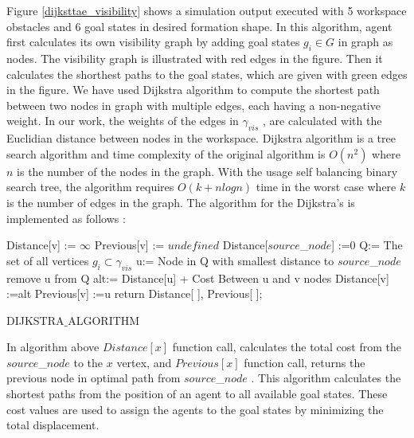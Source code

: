 Figure \ref{dijksttae_visibility} shows a simulation output executed with 5 workspace obstacles and 6 goal states in desired formation shape. In this algorithm, agent first calculates its own visibility graph by adding goal states $g_i \in G$ in graph as nodes. The visibility graph is illustrated with red edges in the figure. Then it calculates the shorthest paths to the goal states, which are given with green edges in the figure. We have used Dijkstra algorithm to compute the shortest path between two nodes in graph with multiple edges, each having a non-negative weight. In our work, the weights of the edges in $\gamma_{vis}$ , are calculated with the Euclidian distance between nodes in the workspace. Dijkstra algorithm is a tree search algorithm and time complexity of the original algorithm is $O(n^2)$ where $n$ is the number of the nodes in the graph. With the usage self balancing binary search tree, the algorithm requires $O(k+nlogn)$ time in the worst case where $k$ is the number of edges in the graph. The algorithm for the Dijkstra's is implemented as follows \cite{92}:
\newpage
	
\begin{algorithm}[H]
{		
Distance[v] := $\infty$ \;
Previous[v] := $undefined$ \;
}
Distance[$source$\_$ node$] :=0  \;
Q:= The set of all vertices $g_i \subset \gamma_{vis}$ \;
{
u:= Node in Q with smallest distance to $source$\_$ node$\;
remove u from Q\;
{
alt:= Distance[u] + Cost Between u and v nodes\;
{
Distance[v] :=alt\;
Previous[v] :=u\;
}
}
}
return Distance[ ], Previous[ ]; \newline
\caption{DIJKSTRA$\_$ALGORITHM}
\end{algorithm}

In algorithm above $Distance[x]$ function call, calculates the total cost from the $source$\_$ node$ to the $x$ vertex, and $Previous[x]$ function call, returns the previous node in optimal path from $source$\_$ node$ . This algorithm calculates the shortest paths from the position of an agent to all available goal states. These cost values are used to assign the agents to the goal states by minimizing the total displacement.  

